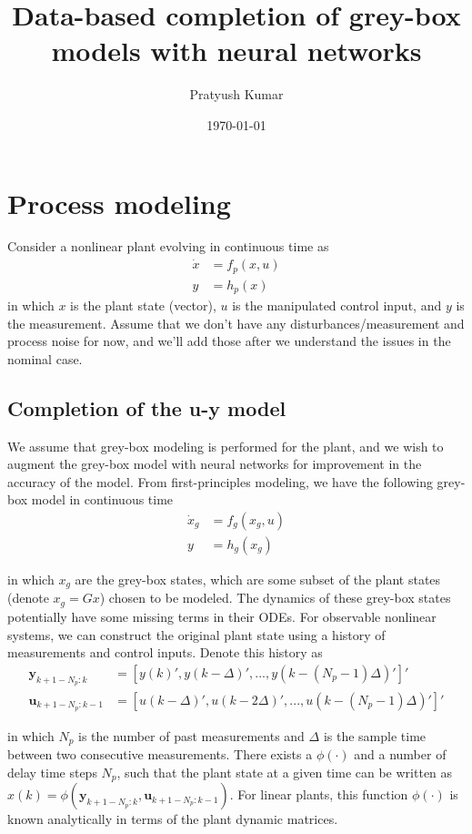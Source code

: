 \documentclass{article}
\title{Data-based completion of grey-box models with neural networks}
\author{Pratyush Kumar}
\date{\today}
\begin{document}
\maketitle

\section{Process modeling}
Consider a nonlinear plant evolving in continuous time as
\begin{align*}
  \dot x &= f_p(x, u) \\
  y &= h_p(x)
\end{align*}
in which $x$ is the plant state (vector), $u$ is the manipulated control input,
and $y$ is the measurement. Assume that we don't have any 
disturbances/measurement and process noise 
for now, and we'll add those after we 
understand the issues in the nominal case.

\subsection{Completion of the u-y model}
We assume that grey-box modeling is performed 
for the plant, and we wish to augment the grey-box model with neural networks
for improvement in the accuracy of the model. From first-principles modeling, 
we have the following grey-box model in continuous time
\begin{align*}
  \dot{x}_g &= f_g(x_g, u) \\
  y &= h_g(x_g)
\end{align*}

in which $x_g$ are the grey-box states, which are some subset 
of the plant states (denote $x_g = Gx$) chosen to 
be modeled. The dynamics of these grey-box states 
potentially have some missing terms 
in their ODEs.
For observable nonlinear systems, 
we can construct the original plant state
using a history of measurements and control inputs.
Denote this history as 
\begin{align*}
  \mathbf{y}_{k+1-N_p:k} &= [y(k)', y(k-\Delta)', ..., y(k-(N_p-1)\Delta)']' \\
  \mathbf{u}_{k+1-N_p:k-1} &= [u(k-\Delta)', u(k-2\Delta)', 
                               ..., u(k-(N_p-1)\Delta)']'
\end{align*}

in which $N_p$ is the number of 
past measurements and
$\Delta$ is the sample time between two consecutive
measurements. There exists a $\phi(\cdot)$ 
and a number of delay 
time steps $N_p$, such that the plant state
at a given time can be written as
$x(k) = \phi(\mathbf{y}_{k+1-N_p:k}, \mathbf{u}_{k+1-N_p:k-1})$.
For linear plants, this function $\phi(\cdot)$
is known analytically in terms of the plant dynamic
matrices.
\end{document}
